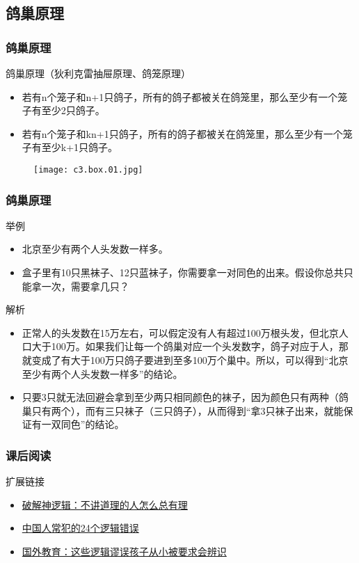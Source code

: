 \subsection{鸽巢原理}
\begin{frame}
  \frametitle{鸽巢原理}
  \begin{block}{鸽巢原理（狄利克雷抽屉原理、鸽笼原理）}
    \begin{itemize}
      \item 若有n个笼子和n+1只鸽子，所有的鸽子都被关在鸽笼里，那么至少有一个笼子有至少2只鸽子。
      \item 若有n个笼子和kn+1只鸽子，所有的鸽子都被关在鸽笼里，那么至少有一个笼子有至少k+1只鸽子。
    \end{itemize}
  \end{block}
  \vspace{-0.5em}
  \begin{figure}
    \centering
    \texttt{[image: c3.box.01.jpg]}
  \end{figure}
\end{frame}

\begin{frame}
  \frametitle{鸽巢原理}
  \begin{block}{举例}
    \begin{itemize}
      \item 北京至少有两个人头发数一样多。
      \item 盒子里有10只黑袜子、12只蓝袜子，你需要拿一对同色的出来。假设你总共只能拿一次，需要拿几只？
    \end{itemize}
  \end{block}
  \pause \pause \pause \pause
  \begin{block}{解析}
    \begin{itemize}
      \item 正常人的头发数在15万左右，可以假定没有人有超过100万根头发，但北京人口大于100万。如果我们让每一个鸽巢对应一个头发数字，鸽子对应于人，那就变成了有大于100万只鸽子要进到至多100万个巢中。所以，可以得到“北京至少有两个人头发数一样多”的结论。
      \item 只要3只就无法回避会拿到至少两只相同颜色的袜子，因为颜色只有两种（鸽巢只有两个），而有三只袜子（三只鸽子），从而得到“拿3只袜子出来，就能保证有一双同色”的结论。
    \end{itemize}
  \end{block}
\end{frame}

\begin{frame}
  \frametitle{课后阅读}
  \begin{block}{扩展链接}
    \begin{itemize}
      \item \href{http://www.thepaper.cn/newsDetail_forward_1500302}{破解神逻辑：不讲道理的人怎么总有理}
      \item \href{https://wx.abbao.cn/a/5248-c37c59ef8e0cd008.html}{中国人常犯的24个逻辑错误}
      \item \href{http://www.edu0-6.com/zixunzhuanqu/xingyedongtai/2216.html}{国外教育：这些逻辑谬误孩子从小被要求会辨识}
    \end{itemize}
  \end{block}
\end{frame}

